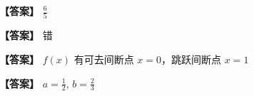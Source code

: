 \documentclass[
  a4paper,
  11pt,
  title in boldface,
  theorem in new line,
  remove problem qed
]{homework}
\begin{document}
\begin{solution}[第 12 题解答]
  \textbf{【答案】} $\frac{6}{5}$

\end{solution}

\begin{solution}[第 13 题解答]
  \textbf{【答案】} 错

\end{solution}

\begin{solution}[第 14 题解答]
  \textbf{【答案】} $f(x)$ 有可去间断点 $x=0$，跳跃间断点 $x=1$

\end{solution}

\begin{solution}[第 15 题解答]
  \textbf{【答案】} $a = \frac{1}{2}$, $b = \frac{2}{3}$

\end{solution}
\end{document}
